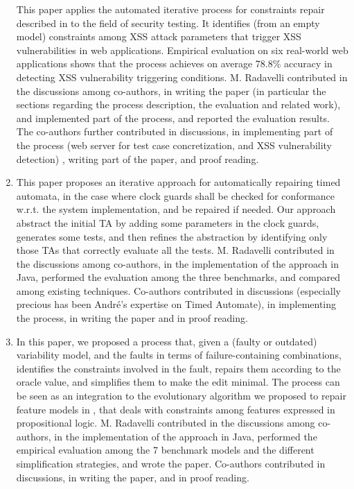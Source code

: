 \begin{enumerate}
	This paper applies the automated iterative process for constraints repair described in \cite{gargantini_combinatorial_2017} to the field of security testing. It identifies (from an empty model) constraints among XSS attack parameters that trigger XSS vulnerabilities in web applications. Empirical evaluation on six real-world web applications shows that the process achieves on average 78.8\% accuracy in detecting XSS vulnerability triggering conditions.
	M. Radavelli contributed in the discussions among co-authors, in writing the paper (in particular the sections regarding the process description, the evaluation and related work), and implemented part of the process, and reported the evaluation results.
	The co-authors further contributed in discussions, in implementing part of the process (web server for test case concretization, and XSS vulnerability detection) , writing part of the paper, and proof reading.
	
	\item \cite{andre_tap_2019} 

	This paper proposes an iterative approach for automatically repairing timed automata, in the case where clock guards shall be checked for conformance w.r.t. the system implementation, and be repaired if needed. 
	Our approach abstract the initial TA by adding some parameters in the clock guards, generates some tests, and then refines the abstraction by identifying only those TAs that correctly evaluate all the tests.
	M. Radavelli contributed in the discussions among co-authors, in the implementation of the approach in Java, performed the evaluation among the three benchmarks, and compared among existing techniques.
	Co-authors contributed in discussions (especially precious has been André's expertise on Timed Automate), in implementing the process, in writing the paper and in proof reading.
	
	\item \cite{arcaini2019varivolution} 

	In this paper, we proposed a process that, given a (faulty or outdated) variability model, and the faults in terms of failure-containing combinations, identifies the constraints involved in the fault, repairs them according to the oracle value, and simplifies them to make the edit minimal. 
	The process can be seen as an integration to the evolutionary algorithm we proposed to repair feature models in \cite{arcaini_evolutionary_2018,arcaini2019achieving}, that deals with constraints among features expressed in propositional logic. 
	M. Radavelli contributed in the discussions among co-authors, in the implementation of the approach in Java, performed the empirical evaluation among the 7 benchmark models and the different simplification strategies, and wrote the paper.
	Co-authors contributed in discussions, in writing the paper, and in proof reading.

\end{enumerate}

